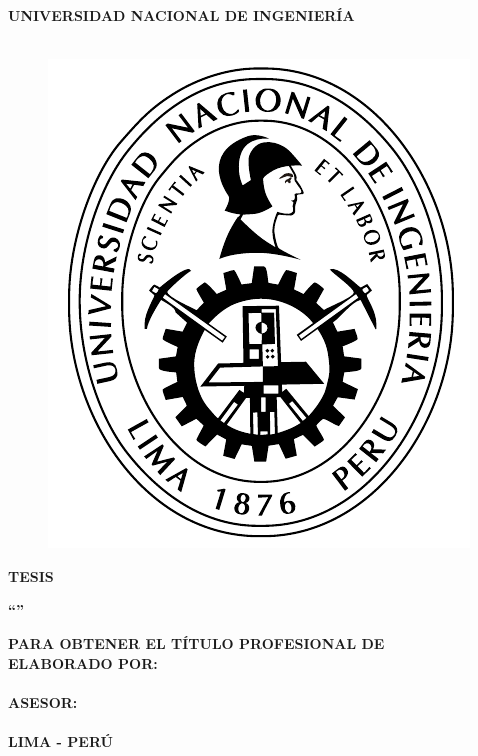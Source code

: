 \begin{titlepage}
	
	\begin{center}
		\vspace*{2 mm}
		{\LARGE \textbf{UNIVERSIDAD NACIONAL DE INGENIERÍA}}\\
		\vspace{5 mm}
		{\Large \textbf{\@facultad}}\\
		\vspace{5.5 mm}
		\begin{figure}[h]
			\centering 
			\includegraphics[scale=1]{E_IMAGENES/1_Protocolar/UNI_LOGO1.pdf}
		\end{figure}
		\vspace{1 mm}	
		{\Large \textbf{TESIS} }\\
		\vspace{4 mm}
		
		\onehalfspacing  %
		{\Large \textbf{``{\@titlecaratula}''} }\\
		
		\singlespacing  %
		
		\vspace{5 mm}	
		{\large \textbf{PARA OBTENER EL TÍTULO PROFESIONAL DE {\@grado} } }\\
		\vspace{10 mm}
		{\large \textbf{ELABORADO POR:} }\\
		\vspace{4 mm}	
		{\large \textbf{\@authorcaratula} }\\
		\vspace{10 mm}
		{\large \textbf{ASESOR:} }\\
		\vspace{4 mm}	
		{\large \textbf{\@asesor} }\\
		\vspace{10 mm}	
		{\large \textbf{LIMA - PERÚ} }\\
		\vspace{4 mm}	
		{\large \textbf{\@yyearr} }\\


\end{center}
\end{titlepage}
